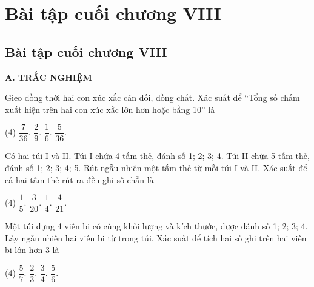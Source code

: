 %

\section*{Bài tập cuối chương VIII}

\begin{exercises}
    \subsection{Bài tập cuối chương VIII}

    \textbf{A. TRẮC NGHIỆM}

    \begin{questions}[resume=SGK]
        \item Gieo đồng thời hai con xúc xắc cân đối, đồng chất. Xác suất để “Tổng số chấm xuất hiện trên hai con xúc xắc lớn hơn hoặc bằng 10” là
        \begin{tasks}(4)
            \task $\dfrac{7}{36}$.
            \task $\dfrac{2}{9}$.
            \task $\dfrac{1}{6}$.
            \task $\dfrac{5}{36}$.
        \end{tasks}
        \par\noindent\answerbox\par

        \item Có hai túi I và II. Túi I chứa 4 tấm thẻ, đánh số 1; 2; 3; 4. Túi II chứa 5 tấm thẻ, đánh số 1; 2; 3; 4; 5. Rút ngẫu nhiên một tấm thẻ từ mỗi túi I và II. Xác suất để cả hai tấm thẻ rút ra đều ghi số chẵn là
        \begin{tasks}(4)
            \task $\dfrac{1}{5}$.
            \task $\dfrac{3}{20}$.
            \task $\dfrac{1}{4}$.
            \task $\dfrac{4}{21}$.
        \end{tasks}
        \par\noindent\answerbox\par

        \item Một túi đựng 4 viên bi có cùng khối lượng và kích thước, được đánh số 1; 2; 3; 4. Lấy ngẫu nhiên hai viên bi từ trong túi. Xác suất để tích hai số ghi trên hai viên bi lớn hơn 3 là
        \begin{tasks}(4)
            \task $\dfrac{5}{7}$.
            \task $\dfrac{2}{3}$.
            \task $\dfrac{3}{4}$.
            \task $\dfrac{5}{6}$.
        \end{tasks}
        \par\noindent\answerbox\par
    \end{questions}


\end{exercises}
